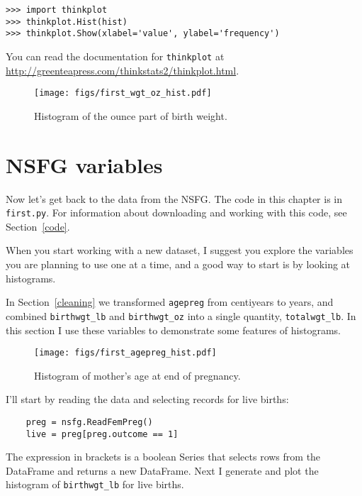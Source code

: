 \documentclass[12pt]{book}
\begin{document}
\begin{verbatim}
>>> import thinkplot
>>> thinkplot.Hist(hist)
>>> thinkplot.Show(xlabel='value', ylabel='frequency')
\end{verbatim}

You can read the documentation for {\tt thinkplot} at
\url{http://greenteapress.com/thinkstats2/thinkplot.html}.


\begin{figure}
\centerline{\texttt{[image: figs/first\_wgt\_oz\_hist.pdf]}}
\caption{Histogram of the ounce part of birth weight.}
\label{first_wgt_oz_hist}
\end{figure}


\section{NSFG variables}

Now let's get back to the data from the NSFG.  The code in this
chapter is in {\tt first.py}.  
For information about downloading and
working with this code, see Section~\ref{code}.

When you start working with a new dataset, I suggest you explore
the variables you are planning to use one at a time, and a good
way to start is by looking at histograms.

In Section~\ref{cleaning} we transformed {\tt agepreg}
from centiyears to years, and combined \verb"birthwgt_lb" and
\verb"birthwgt_oz" into a single quantity, \verb"totalwgt_lb".
In this section I use these variables to demonstrate some
features of histograms.

\begin{figure}
\centerline{\texttt{[image: figs/first\_agepreg\_hist.pdf]}}
\caption{Histogram of mother's age at end of pregnancy.}
\label{first_agepreg_hist}
\end{figure}

I'll start by reading the data and selecting records for live
births:

\begin{verbatim}
    preg = nsfg.ReadFemPreg()
    live = preg[preg.outcome == 1]
\end{verbatim}

The expression in brackets is a boolean Series that
selects rows from the DataFrame and returns a new DataFrame.
Next I generate and plot the histogram of
\verb"birthwgt_lb" for live births.
\end{document}
